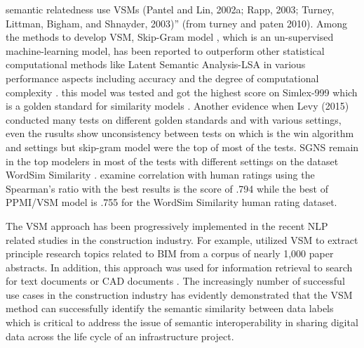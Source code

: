 \documentclass[Journal, BackFigs, DoubleSpace]{ascelike} %
\begin{document}
semantic relatedness use VSMs (Pantel and Lin, 2002a; Rapp, 2003; Turney, Littman,
Bigham, and Shnayder, 2003)'' (from turney and paten 2010). Among the methods to develop VSM, Skip-Gram model \cite{mikolov13a}, which is an un-supervised machine-learning model, has been reported to outperform other statistical computational methods like Latent Semantic Analysis-LSA \cite{landauer1997solution} in various performance aspects including accuracy and the degree of computational complexity \cite{mikolov13a}. this model was tested and got the highest score on Simlex-999 which is a golden standard for similarity models \cite{hill15}. Another evidence when Levy (2015) conducted many tests on different golden standards and with various settings, even the rusults show unconsistency between tests on which is the win algorithm and settings but skip-gram model were the top of most of the tests. SGNS remain in the top modelers in most of the tests with different settings on the dataset WordSim Similarity \cite{levy15}. examine correlation with human ratings using the Spearman's ratio with the best results is the score of .794 while the best of PPMI/VSM model is .755 for the WordSim Similarity human rating dataset.  
\par
The VSM approach has been progressively implemented in the recent NLP related studies in the construction industry. For example,  utilized VSM to extract principle research topics related to BIM from a corpus of nearly 1,000 paper abstracts. In addition, this approach was used for information retrieval to search for text documents \cite{lv15} or CAD documents \cite{hsu13}. The increasingly number of successful use cases in the construction industry has evidently demonstrated that the VSM method can successfully identify the semantic similarity between data labels which is critical to address the issue of semantic interoperability in sharing digital data across the life cycle of an infrastructure project.
\par
% 
\end{document}
